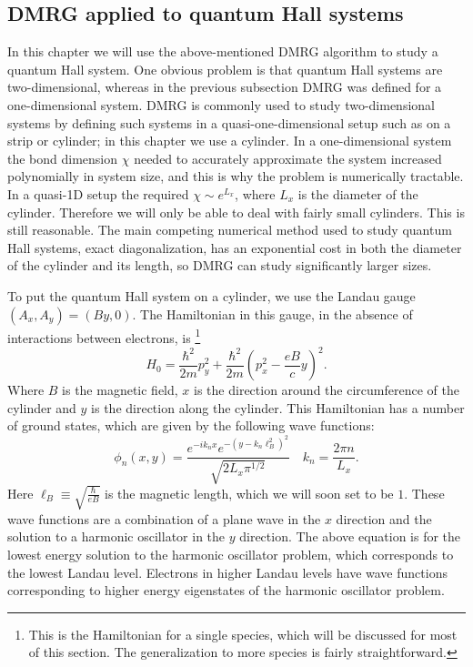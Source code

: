 \subsection{DMRG applied to quantum Hall systems}

In this chapter we will use the above-mentioned DMRG algorithm to study a quantum Hall system. One obvious problem is that quantum Hall systems are two-dimensional, whereas in the previous subsection DMRG was defined for a one-dimensional system. DMRG is commonly used to study two-dimensional systems by defining such systems in a quasi-one-dimensional setup such as on a strip or cylinder; in this chapter we use a cylinder. In a one-dimensional system the bond dimension $\chi$ needed to accurately approximate the system increased polynomially in system size, and this is why the problem is numerically tractable. In a quasi-1D setup the required $\chi\sim e^{L_x}$, where $L_x$ is the diameter of the cylinder. Therefore we will only be able to deal with fairly small cylinders. This is still reasonable. The main competing numerical method used to study quantum Hall systems, exact diagonalization, has an exponential cost in both the diameter of the cylinder and its length, so DMRG can study significantly larger sizes.

To put the quantum Hall system on a cylinder, we use the Landau gauge $(A_x,A_y)=(By,0)$. The Hamiltonian in this gauge, in the absence of interactions between electrons, is
\footnote{This is the Hamiltonian for a single species, which will be discussed for most of this section. The generalization to more species is fairly straightforward\cite{ZaletelMixing}.}
\begin{equation}
H_0=\frac{\hbar^2}{2m}p_y^2+\frac{\hbar^2}{2m}\left(p_x^2-\frac{eB}{c}y\right)^2.
\end{equation}
Where $B$ is the magnetic field, $x$ is the direction around the circumference of the cylinder and $y$ is the direction along the cylinder. This Hamiltonian has a number of ground states, which are given by the following wave functions:
\begin{equation}
\phi_n(x,y)=\frac{e^{-ik_nx}e^{-(y-k_n\ell_B^2)^2}}{\sqrt{2L_x\pi^{1/2}} } \quad k_n=\frac{2\pi n}{L_x}.
\label{formfactors}
\end{equation}
Here $\ell_B\equiv \sqrt{\frac{\hbar}{eB}}$ is the magnetic length, which we will soon set to be $1$. These wave functions are a combination of a plane wave in the $x$ direction and the solution to a harmonic oscillator in the $y$ direction. The above equation is for the lowest energy solution to the harmonic oscillator problem, which corresponds to the lowest Landau level. Electrons in higher Landau levels have wave functions corresponding to higher energy eigenstates of the harmonic oscillator problem.

